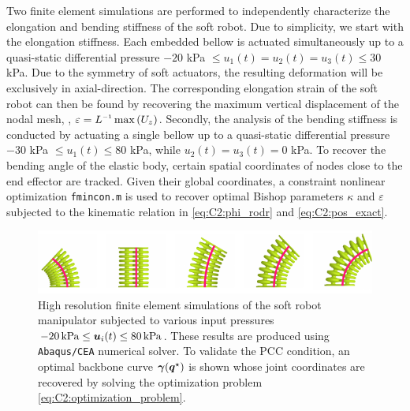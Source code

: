 Two finite element simulations are performed to {independently characterize the elongation and bending stiffness of the soft robot. Due to simplicity, we start with the elongation stiffness}. Each embedded bellow is actuated simultaneously up to a quasi-static differential pressure $-20$ kPa $\le u_1(t) = u_2(t) = u_3(t) \le 30$ kPa. Due to the symmetry of soft actuators, the resulting deformation will be exclusively in axial-direction. The corresponding elongation strain of the soft robot can then be found by recovering the maximum vertical displacement of the nodal mesh, \ie, $\varepsilon = L\inv\max \left( {U}_z \right)$. Secondly, the analysis of the bending stiffness is conducted by actuating a single bellow up to a quasi-static differential pressure $-30$ kPa $\le u_1(t) \le  80$ kPa, while $u_2(t) = u_3(t) = 0$ kPa. To recover the bending angle of the elastic body, certain spatial coordinates of nodes close to the end effector are tracked. Given their global coordinates, a constraint nonlinear optimization \texttt{fmincon.m} is used to recover optimal Bishop parameters $\kappa$ and $\varepsilon
$ subjected to the kinematic relation in \eqref{eq:C2:phi_rodr} and \eqref{eq:C2:pos_exact}.
%
\begin{figure}[!t]
  \centering
  \includegraphics*{./pdf/thesis-figure-4-6.pdf}
  \vspace{-0.2cm}
  \caption{ High resolution finite element simulations of the soft robot manipulator   subjected to various input pressures $-20 \,\si{\kilo \pascal} \le {\boldsymbol{u}}_i(t) \le 80 \,\si{\kilo \pascal}$.  These results are produced using \texttt{Abaqus/CEA} numerical solver.  To validate the PCC condition, an optimal backbone curve ${\boldsymbol{\gamma}}({\boldsymbol{q}}^\star)$ is shown  whose joint coordinates are recovered by solving the optimization problem \eqref{eq:C2:optimization_problem}.}
  \vspace{-0.1cm}
  \label{fig:C2:fem_analysis}
\end{figure}
%
